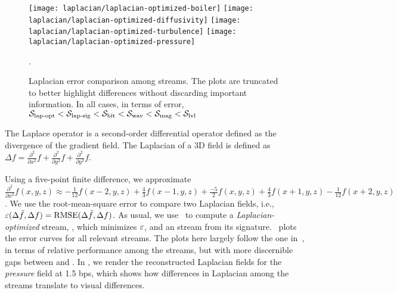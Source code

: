 \begin{figure*}[h]
\centering
{}
{\texttt{[image: laplacian/laplacian-optimized-boiler]}}
{\texttt{[image: laplacian/laplacian-optimized-diffusivity]}}
{\texttt{[image: laplacian/laplacian-optimized-turbulence]}}
{\texttt{[image: laplacian/laplacian-optimized-pressure]}}
\caption{Laplacian error comparison among streams. The plots are truncated to better highlight
differences without discarding important information. In all cases, in terms of error, $\slop <
\slsg < \sbit < \swav < \smag < \slvl$}.
\label{fig:laplacian-error-comparison}
\vspace{1em}


\end{figure*}

The Laplace operator is a second-order differential operator defined as the divergence of the
gradient field. The Laplacian of a 3D field is defined as $\Delta
f=\frac{{\partial}^2}{\partial{x^2}}f+\frac{{\partial}^2}{\partial{y^2}}f+\frac{{\partial}^2}{\partial{y^2}}f$.

Using a five-point finite difference, we approximate $\frac{{\partial}^2}{\partial{x^2}}f(x,y,z)
\approx
-\frac{1}{12}f(x-2,y,z)+\frac{4}{3}f(x-1,y,z)+\frac{-5}{2}f(x,y,z)+\frac{4}{3}f(x+1,y,z)-\frac{1}{12}f(x+2,y,z)$.
We use the root-mean-square error to compare two Laplacian fields, i.e., $\err(\Delta
\tilde{f},\Delta f)=\text{RMSE}(\Delta \tilde{f},\Delta f)$. As usual, we use~ to
compute a \emph{Laplacian-optimized} stream, \slop, which minimizes $\err$, and an \slsg stream from
its signature.~ plots the error curves for all relevant
streams. The plots here largely follow the one in~, in terms of
relative performance among the streams, but with more discernible gaps between \sbit and \slsg. In
, we render the reconstructed Laplacian fields for the
\emph{pressure} field at 1.5 bps, which shows how differences in Laplacian among the streams
translate to visual differences.
